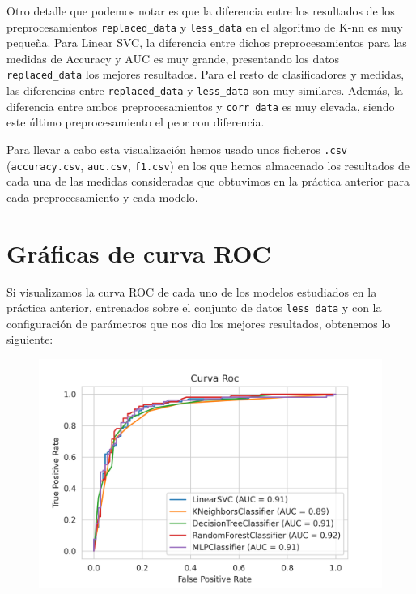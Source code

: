 \documentclass[a4paper,11pt]{book}
\begin{document}
Otro detalle que podemos notar es que la diferencia entre los resultados de los preprocesamientos \texttt{replaced_data} y  \texttt{less_data} en el algoritmo de K-nn es muy pequeña. Para Linear SVC, la diferencia entre dichos preprocesamientos para las medidas de Accuracy y AUC es muy grande, presentando los datos  \texttt{replaced_data} los mejores resultados. Para el resto de clasificadores y medidas, las diferencias entre \texttt{replaced_data} y \texttt{less_data} son muy similares. Además, la diferencia entre ambos preprocesamientos y \texttt{corr_data} es muy elevada, siendo este último preprocesamiento el peor con diferencia. 

Para llevar a cabo esta visualización hemos usado unos ficheros \texttt{.csv} (\texttt{accuracy.csv}, \texttt{auc.csv}, \texttt{f1.csv}) en los que hemos almacenado los resultados de cada una de las medidas consideradas que obtuvimos en la práctica anterior para cada preprocesamiento y cada modelo. 

\section{Gráficas de curva ROC}

Si visualizamos la curva ROC de cada uno de los modelos estudiados en la práctica anterior, entrenados sobre el conjunto de datos \texttt{less_data} y con la configuración de parámetros que nos dio los mejores resultados, obtenemos lo siguiente:
\begin{figure}[H]
	\centering
	\includegraphics[width=0.9\linewidth]{img/curva_roc}
	\caption{}
	\label{fig:curvaroc}
\end{figure}
\end{document}

